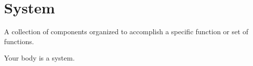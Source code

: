 \section{System}
\label{sec:System}

A collection of components organized to accomplish a specific function or set of functions.

Your body is a system.